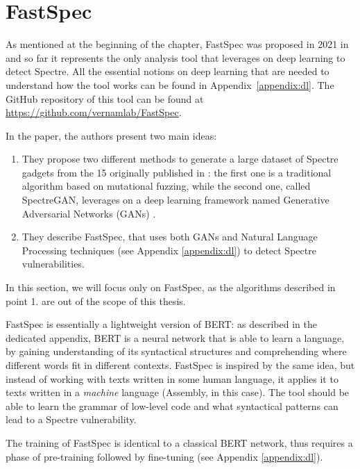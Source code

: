 \documentclass[target=mst,aauheader=aics]{thud}
\theoremstyle{definition}
\begin{document}
	\section{FastSpec}\label{sec:fastspec}
	As mentioned at the beginning of the chapter, FastSpec was proposed in 2021 in \cite{Tol2021} and so far it represents the only analysis tool that leverages on deep learning to detect Spectre. All the essential notions on deep learning that are needed to understand how the tool works can be found in Appendix~\ref{appendix:dl}. The GitHub repository of this tool can be found at \url{https://github.com/vernamlab/FastSpec}. 
	
	In the paper, the authors present two main ideas: 
	\begin{enumerate}
		\item They propose two different methods to generate a large dataset of Spectre gadgets from the 15 originally published in \cite{Kocher2018}: the first one is a traditional algorithm based on mutational fuzzing, while the second one, called SpectreGAN, leverages on a deep learning framework named Generative Adversarial Networks (GANs) \cite{Goodfellow2014}.
		\item They describe FastSpec, that uses both GANs and Natural Language Processing techniques (see Appendix \ref{appendix:dl}) to detect Spectre vulnerabilities.
	\end{enumerate}

	In this section, we will focus only on FastSpec, as the algorithms described in point 1. are out of the scope of this thesis.
	
	FastSpec is essentially a lightweight version of BERT: as described in the dedicated appendix, BERT is a neural network that is able to learn a  language, by gaining understanding of its syntactical structures and comprehending where different words fit in different contexts. FastSpec is inspired by the same idea, but instead of working with texts written in some human language, it applies it to texts written in a \textit{machine} language (Assembly, in this case). The tool should be able to learn the grammar of low-level code and what syntactical patterns can lead to a Spectre vulnerability.
	
	The training of FastSpec is identical to a classical BERT network, thus requires a phase of pre-training followed by fine-tuning (see Appendix \ref{appendix:dl}).
	
\end{document}
